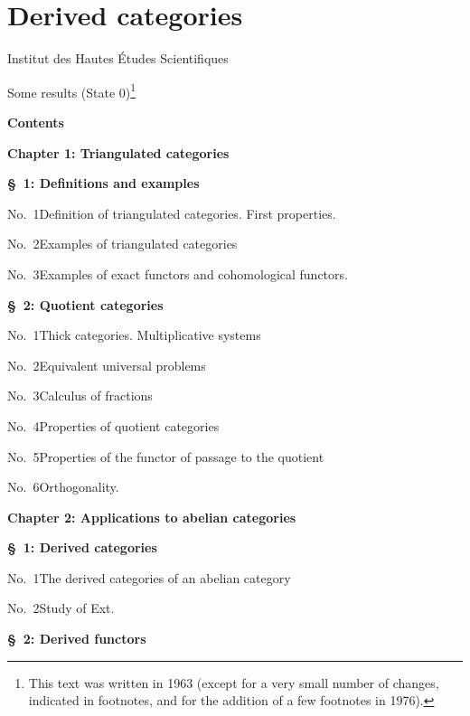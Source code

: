 
\chapter{Derived categories}\label{VIII}
\begin{center}Institut des Hautes Études Scientifiques\end{center}
Some results (State 0)\footnote{This text was written in 1963 (except for a very small number of changes, indicated in footnotes, and for the addition of a few footnotes in 1976).}

\begin{center}\textbf{Contents}\end{center}
\begin{center}\textbf{Chapter 1: Triangulated categories}\end{center}
\noindent\textbf{\S~1: Definitions and examples}\par
\noindent No.~1\quad Definition of triangulated categories. First properties.\par
\noindent No.~2\quad Examples of triangulated categories\par
\noindent No.~3\quad Examples of exact functors and cohomological functors.\par
\medskip\noindent\textbf{\S~2: Quotient categories}\par
\noindent No.~1\quad Thick categories. Multiplicative systems\par
\noindent No.~2\quad Equivalent universal problems\par
\noindent No.~3\quad Calculus of fractions\par
\noindent No.~4\quad Properties of quotient categories\par
\noindent No.~5\quad Properties of the functor of passage to the quotient\par
\noindent No.~6\quad Orthogonality.\par
\begin{center}\textbf{Chapter 2: Applications to abelian categories}\end{center}
\noindent\textbf{\S~1: Derived categories}\par
\noindent No.~1\quad The derived categories of an abelian category\par
\noindent No.~2\quad Study of Ext.\par
\medskip\noindent\textbf{\S~2: Derived functors}\par
